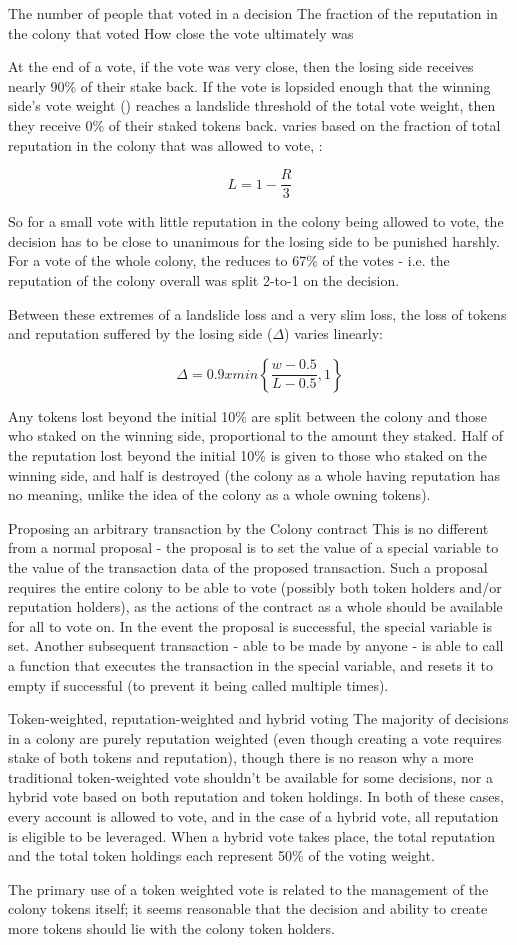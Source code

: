 The number of people that voted in a decision
The fraction of the reputation in the colony that voted
How close the vote ultimately was

At the end of a vote, if the vote was very close, then the losing side receives nearly 90\% of their stake back. If the vote is lopsided enough that the winning side’s vote weight () reaches a landslide threshold  of the total vote weight, then they receive 0\% of their staked tokens back.  varies based on the fraction of total reputation in the colony that was allowed to vote, :

\[
L = 1 - \frac{R}{3}
\]

So for a small vote with little reputation in the colony being allowed to vote, the decision has to be close to unanimous for the losing side to be punished harshly. For a vote of the whole colony, the  reduces to 67\% of the votes - i.e. the reputation of the colony overall was split 2-to-1 on the decision.

Between these extremes of a landslide loss and a very slim loss, the loss of tokens and reputation suffered by the losing side ($\Delta$) varies linearly:

\[
 \Delta = 0.9 x min \left\lbrace \frac{w-0.5}{L-0.5}, 1 \right\rbrace
\]


Any tokens lost beyond the initial 10\% are split between the colony and those who staked on the winning side, proportional to the amount they staked. Half of the reputation lost beyond the initial 10\% is given to those who staked on the winning side, and half is destroyed (the colony as a whole having reputation has no meaning, unlike the idea of the colony as a whole owning tokens).



Proposing an arbitrary transaction by the Colony contract
This is no different from a normal proposal - the proposal is to set the value of a special variable to the value of the transaction data of the proposed transaction. Such a proposal requires the entire colony to be able to vote (possibly both token holders and/or reputation holders), as the actions of the contract as a whole should be available for all to vote on. In the event the proposal is successful, the special variable is set. Another subsequent transaction - able to be made by anyone - is able to call a function that executes the transaction in the special variable, and resets it to empty if successful (to prevent it being called multiple times).

Token-weighted, reputation-weighted and hybrid voting
The majority of decisions in a colony are purely reputation weighted (even though creating a vote requires stake of both tokens and reputation), though there is no reason why a more traditional token-weighted vote shouldn’t be available for some decisions, nor a hybrid vote based on both reputation and token holdings. In both of these cases, every account is allowed to vote, and in the case of a hybrid vote, all reputation is eligible to be leveraged. When a hybrid vote takes place, the total reputation and the total token holdings each represent 50\% of the voting weight.

The primary use of a token weighted vote is related to the management of the colony tokens itself; it seems reasonable that the decision and ability to create more tokens should lie with the colony token holders.
